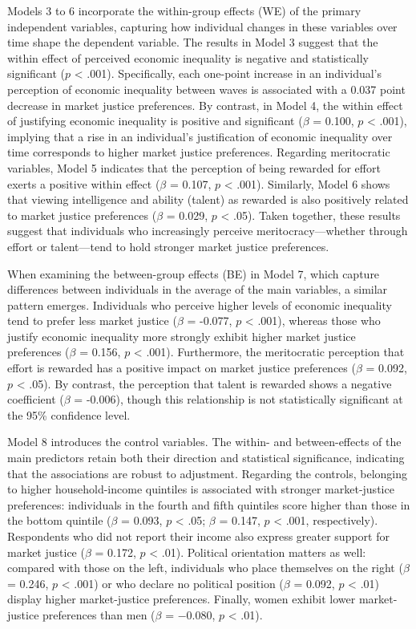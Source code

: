 \documentclass[
  12pt,
]{article}
\begin{document}
Models 3 to 6 incorporate the within-group effects (WE) of the primary
independent variables, capturing how individual changes in these
variables over time shape the dependent variable. The results in Model 3
suggest that the within effect of perceived economic inequality is
negative and statistically significant (\(p\) \textless{} .001).
Specifically, each one-point increase in an individual's perception of
economic inequality between waves is associated with a 0.037 point
decrease in market justice preferences. By contrast, in Model 4, the
within effect of justifying economic inequality is positive and
significant (\(\beta\) = 0.100, \(p\) \textless{} .001), implying that a
rise in an individual's justification of economic inequality over time
corresponds to higher market justice preferences. Regarding meritocratic
variables, Model 5 indicates that the perception of being rewarded for
effort exerts a positive within effect (\(\beta\) = 0.107, \(p\)
\textless{} .001). Similarly, Model 6 shows that viewing intelligence
and ability (talent) as rewarded is also positively related to market
justice preferences (\(\beta\) = 0.029, \(p\) \textless{} .05). Taken
together, these results suggest that individuals who increasingly
perceive meritocracy---whether through effort or talent---tend to hold
stronger market justice preferences.

When examining the between-group effects (BE) in Model 7, which capture
differences between individuals in the average of the main variables, a
similar pattern emerges. Individuals who perceive higher levels of
economic inequality tend to prefer less market justice (\(\beta\) =
-0.077, \(p\) \textless{} .001), whereas those who justify economic
inequality more strongly exhibit higher market justice preferences
(\(\beta\) = 0.156, \(p\) \textless{} .001). Furthermore, the
meritocratic perception that effort is rewarded has a positive impact on
market justice preferences (\(\beta\) = 0.092, \(p\) \textless{} .05).
By contrast, the perception that talent is rewarded shows a negative
coefficient (\(\beta\) = -0.006), though this relationship is not
statistically significant at the 95\% confidence level.

Model 8 introduces the control variables. The within- and
between-effects of the main predictors retain both their direction and
statistical significance, indicating that the associations are robust to
adjustment. Regarding the controls, belonging to higher household-income
quintiles is associated with stronger market-justice preferences:
individuals in the fourth and fifth quintiles score higher than those in
the bottom quintile (\(\beta\) = 0.093, \(p\) \textless{} .05; \(\beta\)
= 0.147, \(p\) \textless{} .001, respectively). Respondents who did not
report their income also express greater support for market justice
(\(\beta\) = 0.172, \(p\) \textless{} .01). Political orientation
matters as well: compared with those on the left, individuals who place
themselves on the right (\(\beta\) = 0.246, \(p\) \textless{} .001) or
who declare no political position (\(\beta\) = 0.092, \(p\) \textless{}
.01) display higher market-justice preferences. Finally, women exhibit
lower market-justice preferences than men (\(\beta\) = −0.080, \(p\)
\textless{} .01).
\end{document}
